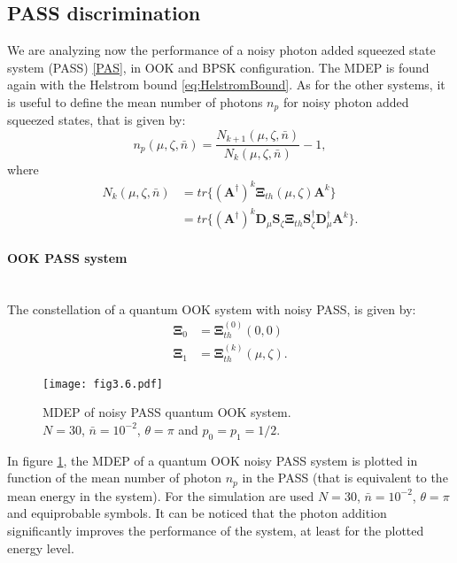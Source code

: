     \subsection{PASS discrimination}
        We are analyzing now the performance of a noisy photon added squeezed state system (PASS)
        \ref{PAS}, in OOK and BPSK configuration. The MDEP is found again with the Helstrom bound
        \ref{eq:HelstromBound}.
        As for the other systems, it is useful to define the mean number of photons $n_p$ for noisy 
        photon added squeezed states, that is given by:
        \begin{equation}
            n_p(\mu,\zeta,\bar{n}) = \frac{N_{k+1}(\mu,\zeta,\bar{n})}{N_k(\mu,\zeta,\bar{n})}-1,
            \label{eq:np_PASS}
        \end{equation}
        where
        \begin{equation}
            \begin{split}
                N_k(\mu,\zeta,\bar{n}) &= tr\{(\pmb{A}^\dagger)^k \pmb{\Xi}_{th}(\mu,\zeta) \pmb{A}^k\}\\
                                       &= tr\{(\pmb{A}^\dagger)^k \pmb{D}_\mu \pmb{S}_\zeta \pmb{\Xi}_{th}
                                        \pmb{S}_\zeta^\dagger \pmb{D}_\mu^\dagger \pmb{A}^k\}.
            \end{split}
        \end{equation}

        \paragraph{OOK PASS system}\mbox{}\\
        The constellation of a quantum OOK system with noisy PASS, is given by:
        \begin{equation}
            \begin{split}
                \pmb{\Xi}_0 &= \pmb{\Xi}_{th}^{(0)}(0,0)\\
                \pmb{\Xi}_1 &= \pmb{\Xi}_{th}^{(k)}(\mu,\zeta).
            \end{split}
        \end{equation}
        \begin{figure}[tbp]
            \begin{center}
                \texttt{[image: fig3.6.pdf]}
                \caption{MDEP of noisy PASS quantum OOK system.\\
                $N=30$, $\bar{n}=10^{-2}$, $\theta=\pi$ and $p_0=p_1=1/2$.}
                \label{fig:3.6}
            \end{center}
        \end{figure}
        In figure \ref{fig:3.6}, the MDEP of a quantum OOK noisy PASS system is plotted in function
        of the mean number of photon $n_p$ in the PASS (that is equivalent to the mean energy
        in the system). For the simulation are used $N=30$, $\bar{n}=10^{-2}$, $\theta=\pi$ and
        equiprobable symbols.
        It can be noticed that the photon addition significantly improves the performance of the system,
        at least for the plotted energy level.

